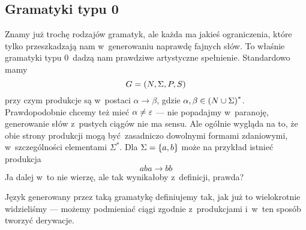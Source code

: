 \subsection{Gramatyki typu 0}
Znamy już trochę rodzajów gramatyk, ale każda ma jakieś ograniczenia, które tylko przeszkadzają nam w~generowaniu naprawdę fajnych słów. To właśnie gramatyki typu 0~dadzą nam prawdziwe artystyczne spełnienie. Standardowo mamy
\[
    G = \left(N, \Sigma, P, S\right)
\]
przy czym produkcje są w~postaci \(\alpha \rightarrow \beta\), gdzie \(\alpha, \beta \in \left(N \cup \Sigma\right)^*\). Prawdopodobnie chcemy też mieć \(\alpha \neq \varepsilon\) --- nie popadajmy w~paranoję, generowanie słów z~pustych ciągów nie ma sensu. Ale ogólnie wygląda na to, że obie strony produkcji mogą być zasadniczo dowolnymi formami zdaniowymi, w~szczególności elementami \(\Sigma^*\). Dla \(\Sigma = \set{a, b}\) może na przykład istnieć produkcja
\[
    aba \rightarrow bb
\]
Ja dalej w~to nie wierzę, ale tak wynikałoby z~definicji, prawda?

Język generowany przez taką gramatykę definiujemy tak, jak już to wielokrotnie widzieliśmy --- możemy podmieniać ciągi zgodnie z~produkcjami i~w~ten sposób tworzyć derywacje.

